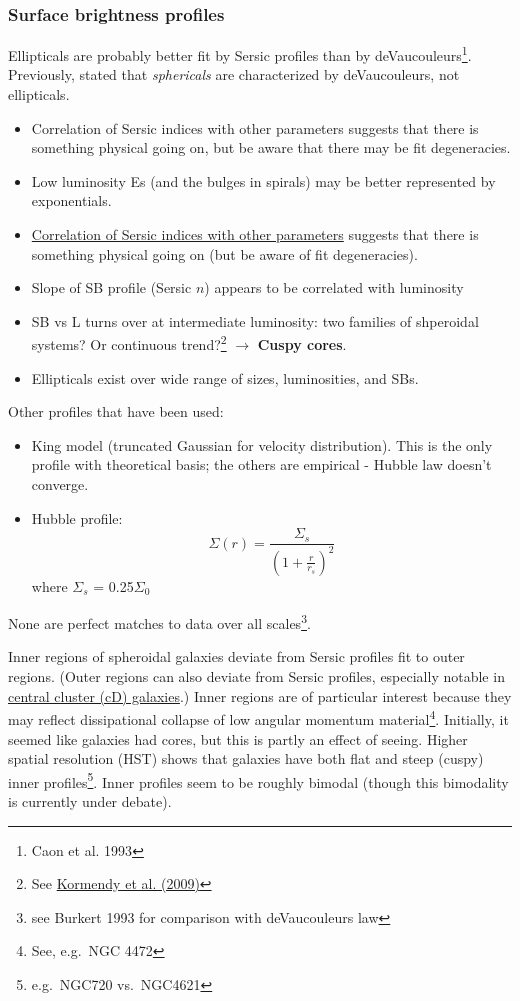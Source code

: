 \documentclass{article}
\newcommand{\mynotes}[1]{\textcolor{cadmiumgreen}{#1}}
\begin{document}
\subsubsection{Surface brightness profiles}
Ellipticals are probably better fit by Sersic profiles than by
deVaucouleurs\footnote{Caon et al. 1993}.
\mynotes{Previously, stated that \emph{sphericals} are characterized
by deVaucouleurs, not ellipticals.}
\begin{itemize}
    \item Correlation of Sersic indices with other parameters
        suggests that there is something physical going on, but be aware that
        there may be fit degeneracies.
    \item Low luminosity Es (and the bulges in spirals) may be better
        represented by exponentials.
    \item \href{http://astronomy.nmsu.edu/holtz/a555/resources/caonfig3.gif}
        {Correlation of Sersic indices with other parameters} suggests that
        there is something physical going on (but be aware of fit degeneracies).
    \item Slope of SB profile (Sersic $n$) appears to be correlated with
        luminosity
    \item SB vs L turns over at intermediate luminosity:
        two families of shperoidal systems? Or continuous trend?\footnote{
            See \href{http://adsabs.harvard.edu/abs/2009ApJS..182..216K}
            {Kormendy et al. (2009)}}
        \mynotes{$\rightarrow$ \textbf{Cuspy cores}}.
    \item Ellipticals exist over wide range of sizes, luminosities, and SBs.
\end{itemize}
Other profiles that have been used:
\begin{itemize}
    \item King model (truncated Gaussian for velocity distribution). This
        is the only profile with theoretical basis; the others are
        empirical - Hubble law doesn't converge.
    \item Hubble profile:
        \[
            \Sigma(r) = \frac{ \Sigma_{s} }
            {\left( 1 + \frac{r}{r_{s}} \right)^{2}}
            \]
        where $\Sigma_{s}$ = 0.25$\Sigma_{0}$
\end{itemize}
None are perfect matches to data over all scales\footnote{see Burkert 1993 for
comparison with deVaucouleurs law}.

Inner regions of spheroidal galaxies deviate from Sersic profiles fit to outer
regions. (Outer regions can also deviate from Sersic profiles, especially
notable in \href{http://astronomy.nmsu.edu/holtz/a555/resources/cDprof1.gif}
{central cluster (cD) galaxies}.)
Inner regions are of particular interest because they may reflect
dissipational collapse of low angular momentum material\footnote{See, e.g.\ NGC
4472}. Initially, it seemed like galaxies had cores, but this is partly an
effect of seeing. Higher spatial resolution (HST) shows that galaxies have both
flat and steep (cuspy) inner profiles\footnote{e.g.\ NGC720 vs.\ NGC4621}.
Inner profiles seem to be roughly bimodal (though this bimodality is currently
under debate).
\end{document}
